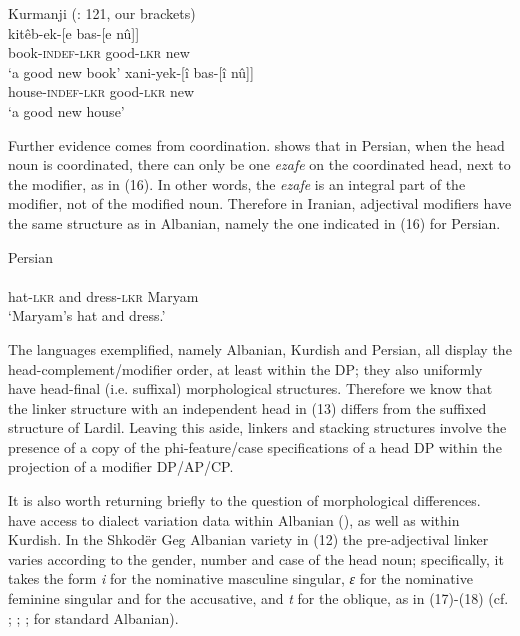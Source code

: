\documentclass[output=paper]{langsci/langscibook}
\begin{document}
  
\ea%
    Kurmanji (\citealt{Yamakido2005}: 121, our brackets)\label{ex:manzini:15}\\
    \ea
    \gll kitêb-ek-[e    bas-[e    nû]]\\
         book-\textsc{indef-lkr}   good-\textsc{lkr}   new\\
    \glt ‘a good new book’
    \ex  
    \gll xani-yek-[î    bas-[î    nû]]\\
         house-\textsc{indef-lkr}   good-\textsc{lkr}   new\\
    \glt ‘a good new house’
    \z
\z    

Further evidence comes from coordination. \citet[37ff.]{Philip2012} shows that in Persian, when the head noun is coordinated, there can only be one \textit{ezafe} on the coordinated head, next to the modifier, as in (16). In other words, the \textit{ezafe} is an integral part of the modifier, not of the modified noun. Therefore in Iranian, adjectival modifiers have the same structure as in Albanian, namely the one indicated in (16) for Persian.

\ea%
         Persian \citep[38]{Philip2012}\label{ex:manzini:16}\\
    \gll{} \\
          hat-\textsc{lkr}   and   dress-\textsc{lkr}   Maryam\\
    \glt  ‘Maryam’s hat and dress.’ 
\z
                    
The languages exemplified, namely Albanian, Kurdish and Persian, all display the head-complement\slash modifier order, at least within the DP; they also uniformly have head-final (i.e. suffixal) morphological structures. Therefore we know that the linker structure with an independent head in (13) differs from the suffixed structure of Lardil. Leaving this aside, linkers and stacking structures involve the presence of a copy of the phi-feature\slash case specifications of a head DP within the projection of a modifier DP\slash AP\slash CP.   

It is also worth returning briefly to the question of morphological differences. \citet{Franco2015} have access to dialect variation data within Albanian (\citealt{Manzini2011Grammatical,Manzini2011Reducing}), as well as within Kurdish. In the Shkodër Geg Albanian variety in (12) the pre-adjectival linker varies according to the gender, number and case of the head noun; specifically, it takes the form \textit{i} for the nominative masculine singular, \textit{ɛ} for the nominative feminine singular and for the accusative, and \textit{t} for the oblique, as in (17)-(18) (cf. \citealt{Solano1972}; \citealt{Camaj1984}; \citealt{Turano2004}; \citealt{Campos2008} for standard Albanian).
\end{document}
